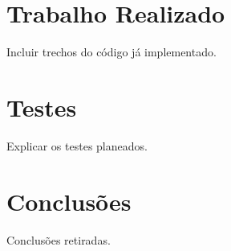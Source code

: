 \begin{titlepage}
\section{Trabalho Realizado}
\justify\normalsize
Incluir trechos do código já implementado.

\section{Testes}
\justify\normalsize
Explicar os testes planeados.

\section{Conclusões}
\justify\normalsize
Conclusões retiradas.

\printindex

\end{titlepage}
